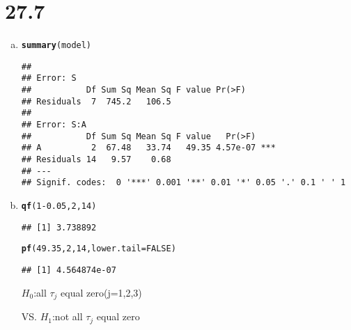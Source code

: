 \documentclass{article}\usepackage[]{graphicx}\usepackage[]{color}
\makeatletter
\newcommand{\hlnum}[1]{\textcolor[rgb]{0.686,0.059,0.569}{#1}}%
\newcommand{\hlopt}[1]{\textcolor[rgb]{0,0,0}{#1}}%
\newcommand{\hlstd}[1]{\textcolor[rgb]{0.345,0.345,0.345}{#1}}%
\newcommand{\hlkwc}[1]{\textcolor[rgb]{0.333,0.667,0.333}{#1}}%
\newcommand{\hlkwd}[1]{\textcolor[rgb]{0.737,0.353,0.396}{\textbf{#1}}}%
\newenvironment{kframe}{%
 \def\at@end@of@kframe{}%
 \ifinner\ifhmode%
  \def\at@end@of@kframe{\end{minipage}}%
  \begin{minipage}{\columnwidth}%
 \fi\fi%
 \def\FrameCommand##1{\hskip\@totalleftmargin \hskip-\fboxsep
 \colorbox{shadecolor}{##1}\hskip-\fboxsep
     \hskip-\linewidth \hskip-\@totalleftmargin \hskip\columnwidth}%
 \MakeFramed {\advance\hsize-\width
   \@totalleftmargin\z@ \linewidth\hsize
   \@setminipage}}%
 {\par\unskip\endMakeFramed%
 \at@end@of@kframe}
\newenvironment{knitrout}{}{} %
\makeatother
\begin{document}
\section{27.7}

\begin{enumerate}[(a)]

\item

\begin{knitrout}
\color{fgcolor}\begin{kframe}
\begin{alltt}
  \hlkwd{summary}\hlstd{(model)}
\end{alltt}
\begin{verbatim}
## 
## Error: S
##           Df Sum Sq Mean Sq F value Pr(>F)
## Residuals  7  745.2   106.5               
## 
## Error: S:A
##           Df Sum Sq Mean Sq F value   Pr(>F)    
## A          2  67.48   33.74   49.35 4.57e-07 ***
## Residuals 14   9.57    0.68                     
## ---
## Signif. codes:  0 '***' 0.001 '**' 0.01 '*' 0.05 '.' 0.1 ' ' 1
\end{verbatim}
\end{kframe}
\end{knitrout}

\item

\begin{knitrout}
\color{fgcolor}\begin{kframe}
\begin{alltt}
  \hlkwd{qf}\hlstd{(}\hlnum{1}\hlopt{-}\hlnum{0.05}\hlstd{,} \hlnum{2}\hlstd{,} \hlnum{14}\hlstd{)}
\end{alltt}
\begin{verbatim}
## [1] 3.738892
\end{verbatim}
\begin{alltt}
  \hlkwd{pf}\hlstd{(}\hlnum{49.35}\hlstd{,} \hlnum{2}\hlstd{,} \hlnum{14}\hlstd{,} \hlkwc{lower.tail} \hlstd{=} \hlnum{FALSE}\hlstd{)}
\end{alltt}
\begin{verbatim}
## [1] 4.564874e-07
\end{verbatim}
\end{kframe}
\end{knitrout}

\begin{center}
$H_0$:all $\tau_j$ equal zero(j=1,2,3)

VS. $H_1$:not all $\tau_j$ equal zero


\end{center}
\end{enumerate}
\end{document}
